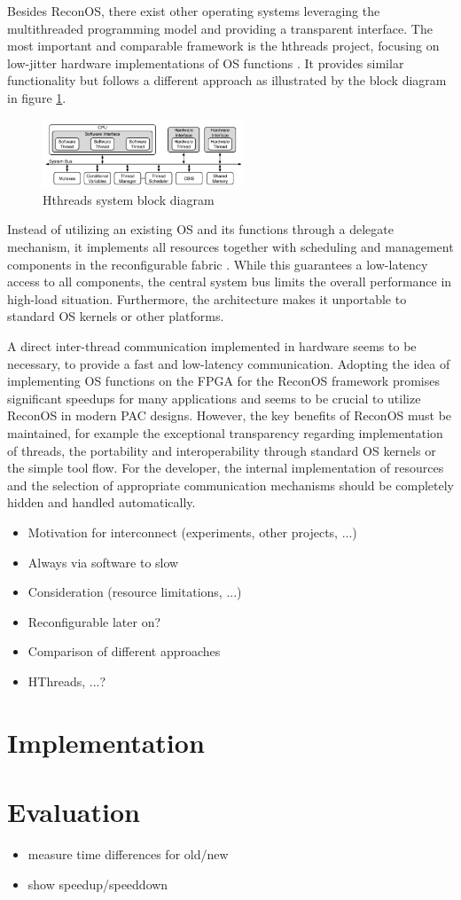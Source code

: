 Besides ReconOS, there exist other operating systems leveraging the
multithreaded programming model and providing a transparent interface. The
most important and comparable framework is the hthreads project, focusing on
low-jitter hardware implementations of \ac{OS} functions \citep{AHK14}. It
provides similar functionality but follows a different approach as illustrated
by the block diagram in figure \ref{fig:hthreads}.
\begin{figure}
	\centering
	\includegraphics[width=6cm]{../figures/hthreads}
	\caption{Hthreads system block diagram \citep{ASA08}}
	\label{fig:hthreads}
\end{figure}
Instead of utilizing an existing \ac{OS} and its functions through a delegate
mechanism, it implements all resources together with scheduling and management
components in the reconfigurable fabric \citep{ASA08}. While this guarantees a
low-latency access to all components, the central system bus limits the
overall performance in high-load situation. Furthermore, the architecture
makes it unportable to standard \ac{OS} kernels or other platforms.

A direct inter-thread communication implemented in hardware seems to be
necessary, to provide a fast and low-latency communication. Adopting the idea
of implementing \ac{OS} functions on the \ac{FPGA} for the ReconOS framework
promises significant speedups for many applications and seems to be crucial to
utilize ReconOS in modern \ac{PAC} designs. However, the key benefits of
ReconOS must be maintained, for example the exceptional transparency regarding
implementation of threads, the portability and interoperability through
standard \ac{OS} kernels or the simple tool flow. For the developer, the
internal implementation of resources and the selection of appropriate
communication mechanisms should be completely hidden and handled
automatically.

\begin{itemize}
\item Motivation for interconnect (experiments, other projects, ...)
\item Always via software to slow
\item Consideration (resource limitations, ...)
\item Reconfigurable later on?
\end{itemize}
\begin{itemize}
\item Comparison of different approaches
\item HThreads, ...?
\end{itemize}
\section{Implementation}
\section{Evaluation}
\begin{itemize}
\item measure time differences for old/new
\item show speedup/speeddown
\end{itemize}